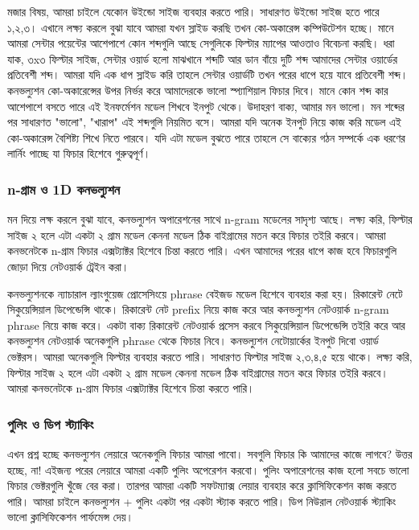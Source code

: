 \documentclass{book}
\begin{document}
মজার বিষয়,  আমরা চাইলে যেকোন উইন্ডো সাইজ ব্যবহার করতে পারি। সাধারণত উইন্ডো সাইজ হতে পারে ১,২,৩। 
এখানে লক্ষ্য করলে বুঝা যাবে আমরা যখন স্লাইড করছি তখন কো-অকারেন্স কম্পিউটেশন হচ্ছে। মানে আমরা সেন্টার পয়েন্টের আশেপাশে কোন শব্দগুলি আছে সেগুলিকে ফিল্টার ম্যাপের আওতাও বিবেচনা করছি।
ধরা যাক, ৩x৩ ফিল্টার সাইজ, সেন্টার ওয়ার্ড হলো মাঝখানে শব্দটি আর ডান বাঁয়ে দুটি শব্দ আমাদের সেন্টার ওয়ার্ডের প্রতিবেশী শব্দ। আমরা যদি এক ধাপ স্লাইড করি তাহলে সেন্টার ওয়ার্ডটি 
তখন পরের ধাপে হয়ে যাবে প্রতিবেশী শব্দ। কনভল্যুশন কো-অকারেন্সের উপর নির্ভর করে আমাদেরকে ভালো স্প্যাশিয়াল ফিচার দিবে। মানে কোন শব্দ কার আশেপাশে বসতে পারে এই ইনফর্মেশন 
মডেল শিখবে ইনপুট থেকে। উদাহরণ বাক্য, আমার মন ভালো। মন শব্দের পর সাধারণত "ভালো",  "খারাপ" এই শব্দগুলি নিয়মিত বসে। আমরা যদি অনেক ইনপুট নিয়ে কাজ করি মডেল এই কো-অকারেন্স 
বৈশিষ্ট্য শিখে নিতে পারবে। যদি এটা মডেল বুঝতে পারে তাহলে সে বাক্যের গঠন সম্পর্কে এক ধরণের লার্নিং পাচ্ছে যা ফিচার হিশেবে গুরুত্বপূর্ণ।

\subsubsection{n-গ্রাম ও 1D কনভল্যুশন}
মন দিয়ে লক্ষ করলে বুঝা যাবে, কনভল্যুশন অপারেশনের সাথে n-gram মডেলের সাদৃশ্য আছে। 
লক্ষ্য করি, ফিল্টার সাইজ ২ হলে এটা একটা ২ গ্রাম মডেল কেননা মডেল ঠিক বাইগ্রামের মতন করে ফিচার তইরি করবে। 
আমরা কনভনেটকে n-গ্রাম ফিচার এক্সট্যাক্টর হিশেবে চিন্তা করতে পারি। এখন আমাদের পরের ধাপে কাজ হবে ফিচারগুলি জোড়া দিয়ে নেটওয়ার্ক ট্রেইন করা।

কনভল্যুশনকে ন্যাচারাল ল্যাংগুয়েজ প্রোসেসিংয়ে phrase বেইজড মডেল হিশেবে ব্যবহার করা হয়। রিকারেন্ট নেটে সিকুয়েন্সিয়াল ডিপেন্ডেন্সি থাকে। 
রিকারেন্ট নেট prefix নিয়ে কাজ করে আর কনভল্যুশন নেটওয়ার্ক n-gram phrase নিয়ে কাজ করে।
একটা বাক্য রিকারেন্ট নেটওয়ার্ক প্রসেস করবে সিকুয়েন্সিয়াল ডিপেন্ডেন্সি তইরি করে আর কনভল্যুশন নেটওয়ার্ক অনেকগুলি phrase থেকে ফিচার নিবে। 
কনভল্যুশন নেটোয়ার্কের ইনপুট দিবো ওয়ার্ড ভেক্টরস। আমরা অনেকগুলি ফিল্টার ব্যবহার করতে পারি। সাধারণত ফিল্টার সাইজ ২,৩,৪,৫ হয়ে থাকে। 
লক্ষ্য করি, ফিল্টার সাইজ ২ হলে এটা একটা ২ গ্রাম মডেল কেননা মডেল ঠিক বাইগ্রামের মতন করে ফিচার তইরি করবে। 
আমরা কনভনেটকে n-গ্রাম ফিচার এক্সট্যাক্টর হিশেবে চিন্তা করতে পারি। 

\subsubsection{পুলিং ও ডিপ স্ট্যাকিং}
এখন প্রশ্ন হচ্ছে কনভল্যুশন লেয়ারে অনেকগুলি ফিচার আমরা পাবো। সবগুলি ফিচার কি আমাদের কাজে লাগবে? 
উত্তর হচ্ছে, না! এইজন্য পরের লেয়ারে আমরা একটি পুলিং অপেরেশন করবো। পুলিং অপারেশনের কাজ হলো সবচে ভালো ফিচার ভেক্টরগুলি খুঁজে বের করা। 
তারপর আমরা একটি সফটম্যাক্স লেয়ার ব্যবহার করে ক্লাসিফিকেশন কাজ করতে পারি। আমরা চাইলে কনভল্যুশন + পুলিং একটা পর একটা স্ট্যাক করতে পারি। 
ডিপ নিউরাল নেটওয়ার্ক স্ট্যাকিং ভালো ক্লাসিফিকেশন পার্ফমেন্স দেয়।
\end{document}
